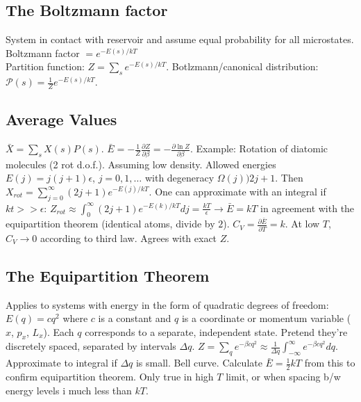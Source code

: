 \documentclass[11pt,twocolumn]{amsart}
\begin{document}
\subsection{The Boltzmann factor}
System in contact with reservoir and assume equal probability for all microstates. Boltzmann factor $=e^{-E(s)/kT}$\\ Partition function:  $Z = \sum_s e^{-E(s)/kT}$. Botlzmann/canonical distribution:  $\mathcal{P}(s) = \frac{1}{Z}e^{-E(s)/kT}$.

\subsection{Average Values}
$\bar{X} = \sum_s X(s) P(s)$. $\bar{E} = -\frac{1}{Z} \frac{\partial Z}{\partial \beta} = -\frac{\partial \ln Z}{\partial \beta}$. Example: Rotation of diatomic molecules (2 rot d.o.f.). Assuming low density. Allowed energies $E(j) = j(j +1)\epsilon$, $j=0,1,\dots$ with degeneracy $\Omega(j) ) 2j + 1$. Then $X_{rot} = \sum_{j=0}^\infty (2j+1) e^{-E(j)/kT}$. One can approximate with an integral if $kt >> \epsilon$: $Z_{rot} \approx \int_0^\infty (2j+1) e^{-E(k)/kT}dj = \frac{kT}{\epsilon} \rightarrow \bar{E} = kT$ in agreement with the equipartition theorem (identical atoms, divide by $2$). $C_V = \frac{\partial \bar{E}}{\partial T} = k$. At low $T$, $C_V \rightarrow 0$ according to third law. Agrees with exact $Z$. 

\subsection{The Equipartition Theorem}
Applies to systems with energy in the form of quadratic degrees of freedom: $E(q) = cq^2$ where $c$ is a constant and $q$ is a coordinate or momentum variable ($x$, $p_x$, $L_x$). Each $q$ corresponds to a separate, independent state. Pretend they're discretely spaced, separated by intervals $\Delta q$. $Z=\sum_q e^{-\beta cq^2} \approx \frac{1}{\Delta q} \int_{-\infty}^\infty e^{-\beta cq^2} dq$. Approximate to integral if $\Delta q$ is small. Bell curve. Calculate $\bar{E}=\frac{1}{2}kT$ from this to confirm equipartition theorem. Only true in high $T$ limit, or when spacing b/w energy levels i much less than $kT$.
\end{document}
